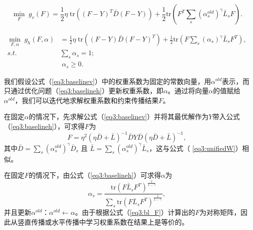 \begin{equation}
\mathop{\mathrm{min}}_{{F}}\;g_v({F})=\frac{1}{2}\eta\;\mathrm{tr}(({F}-{Y})^T\bar{{D}}({F}-{Y}))+\frac{1}{2}\mathrm{tr}({F}^T \sum_s(\alpha_s^{old})^\gamma\bar{{L}}_s{F}).
\label{eq3:baselinev}
\end{equation}

\begin{equation}
\begin{split}
\mathop{\mathrm{min}}_{{F},{\alpha}}\;g_h({F},{\alpha})&=\frac{1}{2}\eta\;\mathrm{tr}(({F}-{Y})\bar{{D}}({F}-{Y})^T)+\frac{1}{2}\mathrm{tr}({F} \sum_s(\alpha_s)^\gamma\bar{{L}}_s{F}^T), \\
s.t.\quad\;& \sum_s \alpha_s = 1;\\ & \; \alpha_s \ge 0.
\end{split}
\label{eq3:baselineh}
\end{equation}

我们假设公式（\ref{eq3:baselinev}）中的权重系数为固定的常数向量，用$ {\alpha}^{old} $表示，而只通过优化问题（\ref{eq3:baselineh}）更新权重系数，即$\alpha$。通过将向量$\alpha$的值赋给$ {\alpha}^{old} $，我们可以迭代地求解权重系数和约束传播结果$F$。

在固定$\alpha$的情况下，先求解公式（\ref{eq3:baselinev}）并将其最优解作为$Y$带入公式（\ref{eq3:baselineh}），可求得$F$为
\begin{equation}
{F} = \eta^2(\eta\bar{{D}}+\bar{{L}})^{-1}\bar{{D}} {Y}\bar{{D}}(\eta\bar{{D}}+\bar{{L}})^{-1}, 
\label{eq3:bl_F}
\end{equation}
其中$\bar{{D}} = \sum_s (\alpha_s^{old})^\gamma  \bar{{D}}_s $ 且 $  \bar{{L}} = \sum_s (\alpha_s^{old})^\gamma  \bar{{L}}_s $，这与公式（ \ref{eq3:unifiedW}）相似。

在固定$F$的情况下，由公式（\ref{eq3:baselineh}）可求得$\alpha$为
\begin{equation}
\alpha_s = \frac{\mathrm{tr}({F} \bar{{L}}_s{F}^T)^\frac{1}{1-\gamma}}{\sum_s \mathrm{tr}({F} \bar{{L}}_s{F}^T)^\frac{1}{1-\gamma}}, 
\end{equation}
并且更新${\alpha}^{old}$：$ {\alpha}^{old} \leftarrow {\alpha}$。由于根据公式（\ref{eq3:bl_F}）计算出的$F$为对称矩阵，因此从竖直传播或水平传播中学习权重系数在结果上是等价的。

